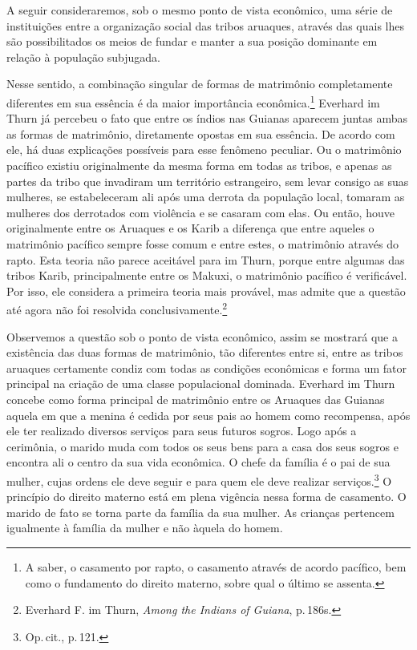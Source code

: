 A seguir consideraremos, sob o mesmo ponto de vista econômico, uma série
de instituições entre a organização social das tribos aruaques, através
das quais lhes são possibilitados os meios de fundar e manter a sua
posição dominante em relação à população subjugada.

Nesse sentido, a combinação singular de formas de matrimônio
completamente diferentes em sua essência é da maior importância
econômica.\footnote{A saber, o casamento por rapto, o casamento através de
acordo pacífico, bem como o fundamento do direito materno, sobre qual o
último se assenta.} Everhard im Thurn já percebeu o fato que entre os
índios nas Guianas aparecem juntas ambas as formas de matrimônio,
diretamente opostas em sua essência. De acordo com ele, há duas
explicações possíveis para esse fenômeno peculiar. Ou o matrimônio
pacífico existiu originalmente da mesma forma em todas as tribos, e
apenas as partes da tribo que invadiram um território estrangeiro, sem
levar consigo as suas mulheres, se estabeleceram ali após uma derrota
da população local, tomaram as mulheres dos derrotados com violência e
se casaram com elas. Ou então, houve originalmente entre os Aruaques e os
Karib a diferença que entre aqueles o matrimônio pacífico sempre fosse
comum e entre estes, o matrimônio através do rapto. Esta teoria não
parece aceitável para im Thurn, porque entre algumas das tribos Karib,
principalmente entre os Makuxi, o matrimônio pacífico é verificável. Por
isso, ele considera a primeira teoria mais provável, mas admite que a
questão até agora não foi resolvida conclusivamente.\footnote{Everhard
  F. im Thurn, \textit{Among the Indians of Guiana}, p.\,186s.}

Observemos a questão sob o ponto de vista econômico, assim se mostrará
que a existência das duas formas de matrimônio, tão diferentes entre si,
entre as tribos aruaques certamente condiz com todas as condições
econômicas e forma um fator principal na criação de uma classe
populacional dominada. Everhard im Thurn concebe como forma principal
de matrimônio entre os Aruaques das Guianas aquela em que a menina é
cedida por seus pais ao homem como recompensa, após ele ter realizado
diversos serviços para seus futuros sogros. Logo após a cerimônia, o
marido muda com todos os seus bens para a casa dos seus sogros e
encontra ali o centro da sua vida econômica. O chefe da família é o pai
de sua mulher, cujas ordens ele deve seguir e para quem ele deve
realizar serviços.\footnote{Op.\,cit., p.\,121.} O princípio do direito
materno está em plena vigência nessa forma de casamento. O marido de
fato se torna parte da família da sua mulher. As crianças pertencem
igualmente à família da mulher e não àquela do homem.

